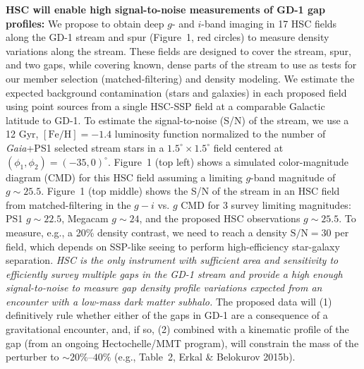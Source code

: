 \documentclass[11pt]{article}
\begin{document}
\textbf{HSC will enable high signal-to-noise measurements of GD-1 gap profiles:}
We propose to obtain deep $g$- and $i$-band imaging in 17 HSC fields along the GD-1 stream and spur (Figure~1, red circles) to measure density variations along the stream.
These fields are designed to cover the stream, spur, and two gaps, while covering known, dense parts of the stream to use as tests for our member selection (matched-filtering) and density modeling.
We estimate the expected background contamination (stars and galaxies) in each proposed field using point sources from a single HSC-SSP field at a comparable Galactic latitude to GD-1. %
To estimate the signal-to-noise (S/N) of the stream, we use a 12 Gyr, $[\textrm{Fe}/\textrm{H}] = -1.4$ luminosity function normalized to the number of \textit{Gaia}+PS1 selected stream stars in a $1.5^\circ \times 1.5^\circ$ field centered at $(\phi_1, \phi_2) = (-35, 0)^\circ$.
Figure~1 (top left) shows a simulated color-magnitude diagram (CMD) for this HSC field assuming a limiting $g$-band magnitude of $g \sim 25.5$.
Figure~1 (top middle) shows the S/N of the stream in an HSC field from matched-filtering in the $g-i$ vs. $g$ CMD for 3 survey limiting magnitudes: PS1 $g \sim 22.5$, Megacam $g \sim 24$, and the proposed HSC observations $g \sim 25.5$.
To measure, e.g., a 20\% density contrast, we need to reach a density $\textrm{S}/\textrm{N} = 30$ per field, which depends on SSP-like seeing to perform high-efficiency star-galaxy separation.
\emph{HSC is the only instrument with sufficient area and sensitivity to efficiently survey multiple gaps in the GD-1 stream and provide a high enough signal-to-noise to measure gap density profile variations expected from an encounter with a low-mass dark matter subhalo.}
The proposed data will (1) definitively rule whether either of the gaps in GD-1 are a consequence of a gravitational encounter, and, if so, (2) combined with a kinematic profile of the gap (from an ongoing Hectochelle/MMT program), will constrain the mass of the perturber to $\sim 20\%$--$40\%$ (e.g., Table~2, Erkal \& Belokurov 2015b).
\end{document}
